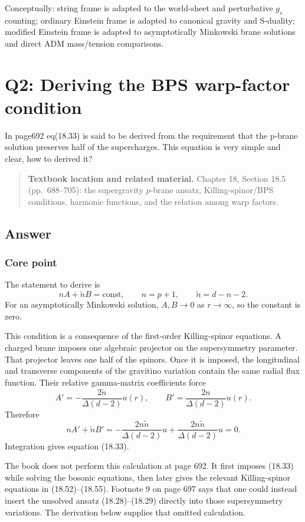 \documentclass[
  10pt,
  a4paper,
  openany]{book}
\begin{document}
Conceptually: string frame is adapted to the world-sheet and
perturbative \(g_s\) counting; ordinary Einstein frame is adapted to
canonical gravity and S-duality; modified Einstein frame is adapted to
asymptotically Minkowski brane solutions and direct ADM mass/tension
comparisons.

\section{Q2: Deriving the BPS warp-factor
condition}\label{q2-deriving-the-bps-warp-factor-condition}

In page692 eq(18.33) is said to be derived from the requirement that the
p-brane solution preserves half of the supercharges. This equation is
very simple and clear, how to derived it?

\begin{quote}
\textbf{Textbook location and related material.} Chapter 18, Section
18.5 (pp.~688--705): the supergravity \(p\)-brane ansatz,
Killing-spinor/BPS conditions, harmonic functions, and the relation
among warp factors.
\end{quote}

\subsection{Answer}\label{answer-37}

\subsubsection{Core point}\label{core-point-37}

The statement to derive is \[
\boxed{nA+\tilde nB=\mathrm{const}},
\qquad
n=p+1,
\qquad
\tilde n=d-n-2.
\] For an asymptotically Minkowski solution, \(A,B\to0\) as
\(r\to\infty\), so the constant is zero.

This condition is a consequence of the first-order Killing-spinor
equations. A charged brane imposes one algebraic projector on the
supersymmetry parameter. That projector leaves one half of the spinors.
Once it is imposed, the longitudinal and transverse components of the
gravitino variation contain the same radial flux function. Their
relative gamma-matrix coefficients force \[
A'=-\frac{2\tilde n}{\Delta(d-2)}u(r),
\qquad
B'=\frac{2n}{\Delta(d-2)}u(r).
\] Therefore \[
nA'+\tilde nB'
=-\frac{2n\tilde n}{\Delta(d-2)}u
+\frac{2n\tilde n}{\Delta(d-2)}u
=0.
\] Integration gives equation (18.33).

The book does not perform this calculation at page 692. It first imposes
(18.33) while solving the bosonic equations, then later gives the
relevant Killing-spinor equations in (18.52)--(18.55). Footnote 9 on
page 697 says that one could instead insert the unsolved ansatz
(18.28)--(18.29) directly into those supersymmetry variations. The
derivation below supplies that omitted calculation.
\end{document}

